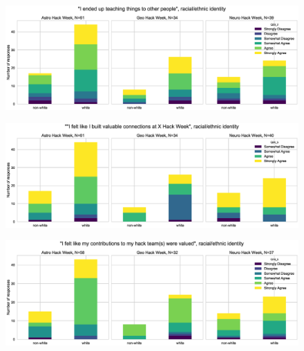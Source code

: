 \documentclass{aastex62}
\begin{document}
\begin{figure}[h!]
\centering
\includegraphics[width=\textwidth]{Q23_2_Q30_stackedbars.eps}
\caption{}
\label{fig:corr10}
\end{figure}

\begin{figure}[h!]
\centering
\includegraphics[width=\textwidth]{Q24_5_Q30_stackedbars.eps}
\caption{}
\label{fig:corr11}
\end{figure}

\begin{figure}[h!]
\centering
\includegraphics[width=\textwidth]{Q19_5_Q30_stackedbars.eps}
\caption{}
\label{fig:corr12}
\end{figure}
\end{document}
